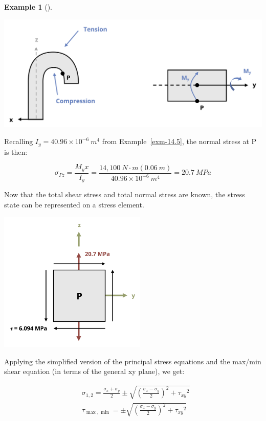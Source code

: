 \documentclass[
  letterpaper,
  DIV=11,
  numbers=noendperiod]{scrreprt}
\theoremstyle{definition}
\newtheorem{example}{Example}[chapter]
\theoremstyle{remark}
\begin{document}
\begin{tcolorbox}
\begin{example}[]
\begin{tcolorbox}
\begin{center}
\includegraphics{images/CH14 PNGs/example 14.7 part 3.png}
\end{center}

Recalling \(I_y = 40.96 \times 10^{-6}{~m^4}\) from
Example~\ref{exm-14.5}, the normal stress at P is then:

\[
\sigma_{P z}=\frac{M_y x}{I_y}=\frac{14,100{~N}\cdot{m}(0.06{~m})}{40.96 \times 10^{-6}{~m^4}}=20.7{~MPa}
\]

Now that the total shear stress and total normal stress are known, the
stress state can be represented on a stress element.

\begin{center}
\includegraphics[width=2.77083in,height=\textheight]{images/CH14 PNGs/example 14.7 part 4.png}
\end{center}

Applying the simplified version of the principal stress equations and
the max/min shear equation (in terms of the general xy plane), we get:

\[
\begin{aligned}
& \sigma_{1,2}=\frac{\sigma_x+\sigma_y}{2} \pm \sqrt{\left(\frac{\sigma_x-\sigma_y}{2}\right)^2+\tau_{x y}{ }^2} \\
& \tau_{\max , \min }= \pm \sqrt{\left(\frac{\sigma_x-\sigma_y}{2}\right)^2+\tau_{x y}{ }^2}
\end{aligned}
\]


\end{tcolorbox}
\end{example}
\end{tcolorbox}
\end{document}
